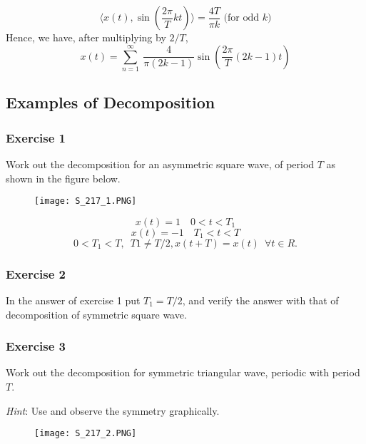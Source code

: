 \begin{equation*} \langle x(t), \sin (\frac{2\pi}{T}kt)\rangle = \frac{4T}{{\pi}k} \textrm{ (for odd }k) \end{equation*}
\noindent
Hence, we have, after multiplying by $2/T$,
\begin{equation*} x(t) = \sum_{n=1}^{\infty}\ \frac{4}{{\pi}(2k-1)} \sin (\frac{2\pi}{T}(2k-1)t)\end{equation*} 

\subsection{Examples of Decomposition}
\subsubsection{Exercise 1} 
\noindent
Work out the decomposition for an asymmetric square wave, of period $T$ as shown in the figure below.
\begin{figure}[ht]
\centering
\texttt{[image: S\_217\_1.PNG]}
\end{figure}
 				\begin{equation*} x(t) = 1 \enspace \enspace      0<t<T_1 \end{equation*}
       			\begin{equation*} x(t) = -1  \enspace\enspace 	T_1 < t< T \end{equation*} \begin{equation*}0<T_1<T, \enspace T1\neq T/2, x(t+T) = x(t)\enspace  \forall t\in R.  \end{equation*}

                
\subsubsection{Exercise 2}
\noindent
In the answer of exercise 1 put $T_1 =T/2$, and verify the answer with that of decomposition of symmetric square wave.

\subsubsection{Exercise 3}
\noindent
Work out the decomposition for symmetric triangular wave, periodic with period $T$.

\noindent
\textit{Hint}: Use and observe the symmetry graphically.
\begin{figure}[ht]
\centering
\texttt{[image: S\_217\_2.PNG]}
\end{figure}



